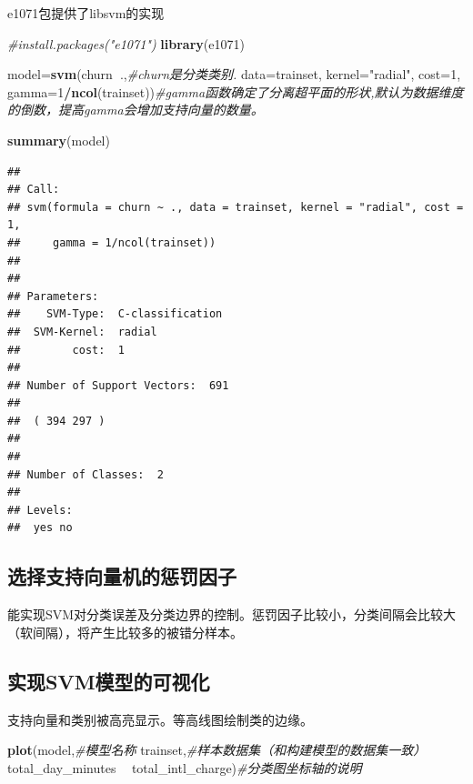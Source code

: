 \documentclass[
]{article}
\newenvironment{Shaded}{\begin{snugshade}}{\end{snugshade}}
\newcommand{\CommentTok}[1]{\textcolor[rgb]{0.56,0.35,0.01}{\textit{#1}}}
\newcommand{\DataTypeTok}[1]{\textcolor[rgb]{0.13,0.29,0.53}{#1}}
\newcommand{\DecValTok}[1]{\textcolor[rgb]{0.00,0.00,0.81}{#1}}
\newcommand{\KeywordTok}[1]{\textcolor[rgb]{0.13,0.29,0.53}{\textbf{#1}}}
\newcommand{\NormalTok}[1]{#1}
\newcommand{\OperatorTok}[1]{\textcolor[rgb]{0.81,0.36,0.00}{\textbf{#1}}}
\newcommand{\StringTok}[1]{\textcolor[rgb]{0.31,0.60,0.02}{#1}}
\begin{document}
e1071包提供了libsvm的实现

\begin{Shaded}
\begin{Highlighting}[]
\CommentTok{#install.packages("e1071")}
\KeywordTok{library}\NormalTok{(e1071)}

\NormalTok{model=}\KeywordTok{svm}\NormalTok{(churn}\OperatorTok{~}\NormalTok{.,}\CommentTok{#churn是分类类别.}
          \DataTypeTok{data=}\NormalTok{trainset,}
          \DataTypeTok{kernel=}\StringTok{"radial"}\NormalTok{,}
          \DataTypeTok{cost=}\DecValTok{1}\NormalTok{,}
          \DataTypeTok{gamma=}\DecValTok{1}\OperatorTok{/}\KeywordTok{ncol}\NormalTok{(trainset))}\CommentTok{#gamma函数确定了分离超平面的形状,默认为数据维度的倒数，提高gamma会增加支持向量的数量。}

\KeywordTok{summary}\NormalTok{(model)}
\end{Highlighting}
\end{Shaded}

\begin{verbatim}
## 
## Call:
## svm(formula = churn ~ ., data = trainset, kernel = "radial", cost = 1, 
##     gamma = 1/ncol(trainset))
## 
## 
## Parameters:
##    SVM-Type:  C-classification 
##  SVM-Kernel:  radial 
##        cost:  1 
## 
## Number of Support Vectors:  691
## 
##  ( 394 297 )
## 
## 
## Number of Classes:  2 
## 
## Levels: 
##  yes no
\end{verbatim}

\hypertarget{ux9009ux62e9ux652fux6301ux5411ux91cfux673aux7684ux60e9ux7f5aux56e0ux5b50}{%
\subsection{选择支持向量机的惩罚因子}\label{ux9009ux62e9ux652fux6301ux5411ux91cfux673aux7684ux60e9ux7f5aux56e0ux5b50}}

能实现SVM对分类误差及分类边界的控制。惩罚因子比较小，分类间隔会比较大（软间隔），将产生比较多的被错分样本。

\hypertarget{ux5b9eux73b0svmux6a21ux578bux7684ux53efux89c6ux5316}{%
\subsection{实现SVM模型的可视化}\label{ux5b9eux73b0svmux6a21ux578bux7684ux53efux89c6ux5316}}

支持向量和类别被高亮显示。等高线图绘制类的边缘。

\begin{Shaded}
\begin{Highlighting}[]
\KeywordTok{plot}\NormalTok{(model,}\CommentTok{#模型名称}
\NormalTok{     trainset,}\CommentTok{#样本数据集（和构建模型的数据集一致）}
\NormalTok{     total_day_minutes }\OperatorTok{~}\StringTok{ }\NormalTok{total_intl_charge)}\CommentTok{#分类图坐标轴的说明}
\end{Highlighting}
\end{Shaded}
\end{document}
